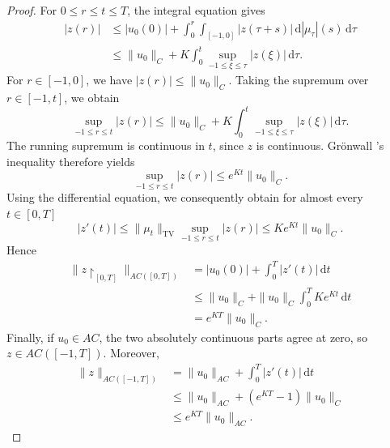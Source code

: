 \documentclass[reqno]{amsart}
\theoremstyle{plain}
\numberwithin{equation}{section}
\numberwithin{definition}{section}
\newcommand{\dd}{\ensuremath{\mathrm{d}}}
\begin{document}
\begin{proof}
For $0\leq r\leq t\leq T$, the integral equation gives
\begin{equation*}
    \begin{aligned}
        |z(r)|
        &\leq
        |u_0(0)|
        +
        \int_0^r\int_{[-1,0]}
        |z(\tau+s)|\,\dd|\mu_\tau|(s)\,\dd\tau\\
        &\leq
        \|u_0\|_C
        +
        K\int_0^t
        \sup_{-1\leq \xi\leq\tau}|z(\xi)|\,\dd\tau.
    \end{aligned}
\end{equation*}
For $r\in[-1,0]$, we have $|z(r)|\leq\|u_0\|_C$.
Taking the supremum over $r\in[-1,t]$, we obtain
\begin{equation*}
    \sup_{-1\leq r\leq t}|z(r)|
    \leq
    \|u_0\|_C
    +
    K\int_0^t
    \sup_{-1\leq \xi\leq\tau}|z(\xi)|\,\dd\tau.
\end{equation*}
The running supremum is continuous in $t$, since $z$
is continuous. Gr{\"o}nwall 's inequality therefore yields
\begin{equation*}
    \sup_{-1\leq r\leq t}|z(r)|
    \leq e^{Kt}\|u_0\|_C.
\end{equation*}
Using the differential equation, we consequently obtain
for almost every $t\in[0,T]$
\begin{equation*}
    |z'(t)|
    \leq
    \|\mu_t\|_{\mathrm{TV}}
    \sup_{-1\leq r\leq t}|z(r)|
    \leq Ke^{Kt}\|u_0\|_C.
\end{equation*}
Hence
\begin{equation*}
    \begin{aligned}
        \|z{\restriction}_{[0,T]}\|_{AC([0,T])}
        &=
        |u_0(0)|+\int_0^T|z'(t)|\,\dd t\\
        &\leq
        \|u_0\|_C
        +
        \|u_0\|_C\int_0^T Ke^{Kt}\,\dd t\\
        &=e^{KT}\|u_0\|_C.
    \end{aligned}
\end{equation*}
Finally, if $u_0\in AC$, the two absolutely continuous
parts agree at zero, so $z\in AC([-1,T])$.
Moreover,
\begin{equation*}
    \begin{aligned}
        \|z\|_{AC([-1,T])}
        &=
        \|u_0\|_{AC}+\int_0^T|z'(t)|\,\dd t\\
        &\leq
        \|u_0\|_{AC}+(e^{KT}-1)\|u_0\|_C\\
        &\leq e^{KT}\|u_0\|_{AC}.
    \end{aligned}
\end{equation*}
\end{proof}
\end{document}
